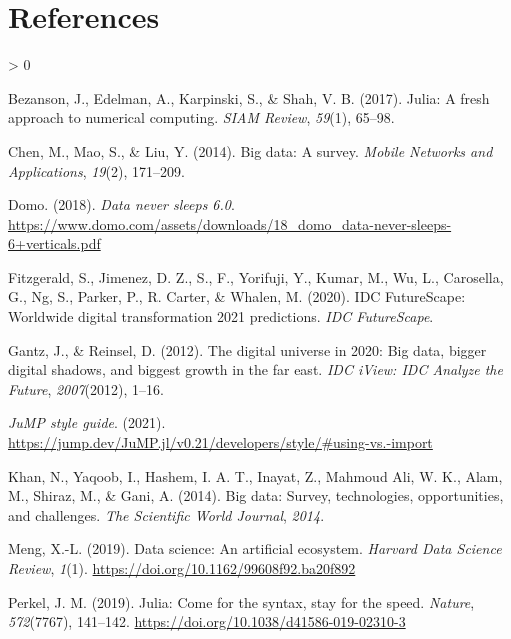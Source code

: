 \documentclass[
  notoc %
]{tufte-book}
\newlength{\cslhangindent}
\newenvironment{CSLReferences}[2] %
 {%
  \setlength{\parindent}{0pt}
  \ifodd #1 \everypar{\setlength{\hangindent}{\cslhangindent}}\ignorespaces\fi
  \ifnum #2 > 0
  \setlength{\parskip}{#2\baselineskip}
  \fi
 }%
 {}
\begin{document}
\hypertarget{references}{%
\chapter*{References}\label{references}}

\hypertarget{refs}{}
\begin{CSLReferences}{1}{0}
\leavevmode{}%
Bezanson, J., Edelman, A., Karpinski, S., \& Shah, V. B. (2017). Julia:
{A} fresh approach to numerical computing. \emph{SIAM Review},
\emph{59}(1), 65--98.

\leavevmode{}%
Chen, M., Mao, S., \& Liu, Y. (2014). Big data: A survey. \emph{Mobile
Networks and Applications}, \emph{19}(2), 171--209.

\leavevmode{}%
Domo. (2018). \emph{Data never sleeps 6.0}.
\url{https://www.domo.com/assets/downloads/18_domo_data-never-sleeps-6+verticals.pdf}

\leavevmode{}%
Fitzgerald, S., Jimenez, D. Z., S., F., Yorifuji, Y., Kumar, M., Wu, L.,
Carosella, G., Ng, S., Parker, P., R. Carter, \& Whalen, M. (2020). IDC
FutureScape: Worldwide digital transformation 2021 predictions.
\emph{IDC FutureScape}.

\leavevmode{}%
Gantz, J., \& Reinsel, D. (2012). The digital universe in 2020: Big
data, bigger digital shadows, and biggest growth in the far east.
\emph{IDC iView: IDC Analyze the Future}, \emph{2007}(2012), 1--16.

\leavevmode{}%
\emph{JuMP style guide}. (2021).
\url{https://jump.dev/JuMP.jl/v0.21/developers/style/\#using-vs.-import}

\leavevmode{}%
Khan, N., Yaqoob, I., Hashem, I. A. T., Inayat, Z., Mahmoud Ali, W. K.,
Alam, M., Shiraz, M., \& Gani, A. (2014). Big data: Survey,
technologies, opportunities, and challenges. \emph{The Scientific World
Journal}, \emph{2014}.

\leavevmode{}%
Meng, X.-L. (2019). Data science: An artificial ecosystem. \emph{Harvard
Data Science Review}, \emph{1}(1).
\url{https://doi.org/10.1162/99608f92.ba20f892}

\leavevmode{}%
Perkel, J. M. (2019). Julia: Come for the syntax, stay for the speed.
\emph{Nature}, \emph{572}(7767), 141--142.
\url{https://doi.org/10.1038/d41586-019-02310-3}


\end{CSLReferences}
\end{document}
